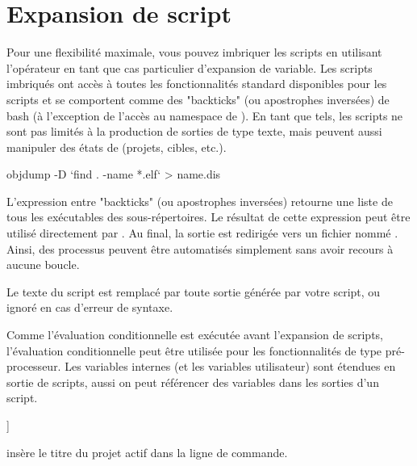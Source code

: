 \section{Expansion de script}

Pour une flexibilité maximale, vous pouvez imbriquer les scripts en utilisant l'opérateur \codeline{[[ ]]} en tant que cas particulier d'expansion de variable. Les scripts imbriqués ont accès à toutes les fonctionnalités standard disponibles pour les scripts et se comportent comme des "backticks" (ou apostrophes inversées) de bash (à l'exception de l'accès au namespace de \codeblocks ). En tant que tels, les scripts ne sont pas limités à la production de sorties de type texte, mais peuvent aussi manipuler des états de \codeblocks (projets, cibles, etc.).



\begin{cmd}
objdump -D `find . -name *.elf` > name.dis
\end{cmd}

L'expression entre "backticks" (ou apostrophes inversées) retourne une liste de tous les exécutables  des sous-répertoires. Le résultat de cette expression peut être utilisé directement par . Au final, la sortie est redirigée vers un fichier nommé . Ainsi, des processus peuvent être automatisés simplement sans avoir recours à aucune boucle.


Le texte du script est remplacé par toute sortie générée par votre script, ou ignoré en cas d'erreur de syntaxe.

Comme l'évaluation conditionnelle est exécutée avant l'expansion de scripts, l'évaluation conditionnelle peut être utilisée pour les fonctionnalités de type pré-processeur. Les variables internes (et les variables utilisateur) sont étendues en sortie de scripts, aussi on peut référencer des variables dans les sorties d'un script.

\begin{code}
[[ print(GetProjectManager().GetActiveProject().GetTitle()); ]]
\end{code}

insère le titre du projet actif dans la ligne de commande.

